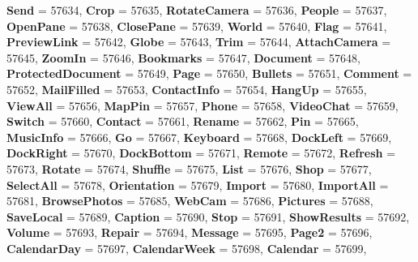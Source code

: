 \begin{DoxyCompactItemize}
{\bfseries Send} = 57634, 
{\bfseries Crop} = 57635, 
\newline
{\bfseries Rotate\+Camera} = 57636, 
{\bfseries People} = 57637, 
{\bfseries Open\+Pane} = 57638, 
{\bfseries Close\+Pane} = 57639, 
\newline
{\bfseries World} = 57640, 
{\bfseries Flag} = 57641, 
{\bfseries Preview\+Link} = 57642, 
{\bfseries Globe} = 57643, 
\newline
{\bfseries Trim} = 57644, 
{\bfseries Attach\+Camera} = 57645, 
{\bfseries Zoom\+In} = 57646, 
{\bfseries Bookmarks} = 57647, 
\newline
{\bfseries Document} = 57648, 
{\bfseries Protected\+Document} = 57649, 
{\bfseries Page} = 57650, 
{\bfseries Bullets} = 57651, 
\newline
{\bfseries Comment} = 57652, 
{\bfseries Mail\+Filled} = 57653, 
{\bfseries Contact\+Info} = 57654, 
{\bfseries Hang\+Up} = 57655, 
\newline
{\bfseries View\+All} = 57656, 
{\bfseries Map\+Pin} = 57657, 
{\bfseries Phone} = 57658, 
{\bfseries Video\+Chat} = 57659, 
\newline
{\bfseries Switch} = 57660, 
{\bfseries Contact} = 57661, 
{\bfseries Rename} = 57662, 
{\bfseries Pin} = 57665, 
\newline
{\bfseries Music\+Info} = 57666, 
{\bfseries Go} = 57667, 
{\bfseries Keyboard} = 57668, 
{\bfseries Dock\+Left} = 57669, 
\newline
{\bfseries Dock\+Right} = 57670, 
{\bfseries Dock\+Bottom} = 57671, 
{\bfseries Remote} = 57672, 
{\bfseries Refresh} = 57673, 
\newline
{\bfseries Rotate} = 57674, 
{\bfseries Shuffle} = 57675, 
{\bfseries List} = 57676, 
{\bfseries Shop} = 57677, 
\newline
{\bfseries Select\+All} = 57678, 
{\bfseries Orientation} = 57679, 
{\bfseries Import} = 57680, 
{\bfseries Import\+All} = 57681, 
\newline
{\bfseries Browse\+Photos} = 57685, 
{\bfseries Web\+Cam} = 57686, 
{\bfseries Pictures} = 57688, 
{\bfseries Save\+Local} = 57689, 
\newline
{\bfseries Caption} = 57690, 
{\bfseries Stop} = 57691, 
{\bfseries Show\+Results} = 57692, 
{\bfseries Volume} = 57693, 
\newline
{\bfseries Repair} = 57694, 
{\bfseries Message} = 57695, 
{\bfseries Page2} = 57696, 
{\bfseries Calendar\+Day} = 57697, 
\newline
{\bfseries Calendar\+Week} = 57698, 
{\bfseries Calendar} = 57699, 

\end{DoxyCompactItemize}
